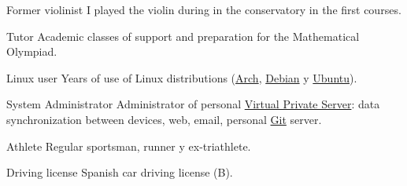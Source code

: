 

\cvachievement{\faMusic}
{Former violinist \smallskip}
{\small {}%
  \small{}}
I played the violin during in the conservatory in the first courses.

\divider

\cvachievement{\faGroup}
{Tutor \smallskip}
{Academic classes of support and preparation for the Mathematical Olympiad.}

\divider

\cvachievement{\faLinux}
{Linux user \smallskip}
{Years of use of Linux distributions (\href{https://www.archlinux.org/}{Arch},
\href{https://www.debian.org/}{Debian} y \href{https://ubuntu.com/}{Ubuntu}).}

\divider

\cvachievement{\faServer}
{System Administrator}
{Administrator of personal
\href{https://en.wikipedia.org/wiki/Virtual_private_server}{Virtual Private
Server}: data synchronization between devices, web, email, personal
\href{https://en.wikipedia.org/wiki/Git}{Git} server.}

\divider

\cvachievement{\faHeartbeat}
{Athlete \smallskip}
{Regular sportsman, runner y ex-triathlete.}

\divider

\cvachievement{\faCar}
{Driving license \smallskip}
{\small {}%
  \small{}}
Spanish car driving license (B).
